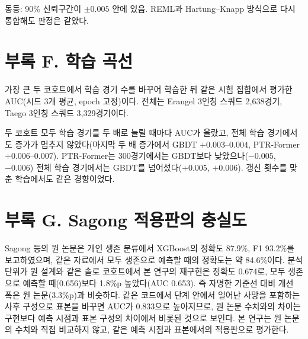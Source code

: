동등: 90\% 신뢰구간이 $\pm0.005$ 안에 있음. REML과 Hartung--Knapp 방식으로 다시 통합해도 판정은 같았다.

\section*{부록 F. 학습 곡선}
가장 큰 두 코호트에서 학습 경기 수를 바꾸어 학습한 뒤 같은 시험 집합에서 평가한 AUC(시드 3개 평균, epoch 고정)이다. 전체는 Erangel 3인칭 스쿼드 2,638경기, Taego 3인칭 스쿼드 3,329경기이다.

\noindent{}

두 코호트 모두 학습 경기를 두 배로 늘릴 때마다 AUC가 올랐고, 전체 학습 경기에서도 증가가 멈추지 않았다(마지막 두 배 증가에서 GBDT $+0.003$--$0.004$, PTR-Former $+0.006$--$0.007$). PTR-Former는 300경기에서는 GBDT보다 낮았으나($-0.005$, $-0.006$) 전체 학습 경기에서는 GBDT를 넘어섰다($+0.005$, $+0.006$). 갱신 횟수를 맞춘 학습에서도 같은 경향이었다.

\section*{부록 G. Sagong 적용판의 충실도}
Sagong 등의 원 논문은 개인 생존 분류에서 XGBoost의 정확도 87.9\%, F1 93.2\%를 보고하였으며, 같은 자료에서 모두 생존으로 예측할 때의 정확도는 약 84.6\%이다. 분석 단위가 원 설계와 같은 솔로 코호트에서 본 연구의 재구현은 정확도 0.674로, 모두 생존으로 예측할 때(0.656)보다 1.8\%p 높았다(AUC 0.653). 즉 자명한 기준선 대비 개선 폭은 원 논문(3.3\%p)과 비슷하다. 같은 코드에서 단계 안에서 일어난 사망을 포함하는 사후 구성으로 표본을 바꾸면 AUC가 0.833으로 높아지므로, 원 논문 수치와의 차이는 구현보다 예측 시점과 표본 구성의 차이에서 비롯된 것으로 보인다. 본 연구는 원 논문의 수치와 직접 비교하지 않고, 같은 예측 시점과 표본에서의 적용판으로 평가한다.
